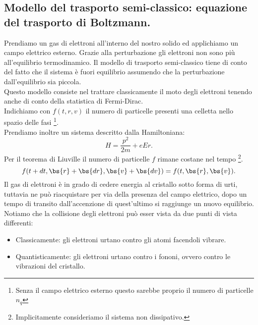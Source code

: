 \subsection{Modello del trasporto semi-classico: equazione del trasporto di Boltzmann.}
\label{subsubsec:Modello del trasporto semi-classico.}
Prendiamo un gas di elettroni all'interno del nostro solido ed applichiamo un campo elettrico esterno. Grazie alla perturbazione gli elettroni non sono più all'equilibrio termodinamico.
Il modello di trasporto semi-classico tiene di conto del fatto che il sistema è fuori equilibrio assumendo che la perturbazione dall'equilibrio sia piccola.\\
Questo modello consiste nel trattare classicamente il moto degli elettroni tenendo anche di conto della statistica di Fermi-Dirac.\\
Indichiamo con $f( t, r, v) $ il numero di particelle presenti una celletta nello spazio delle fasi \footnote{Senza il campo elettrico esterno questo sarebbe proprio il numero di particelle $n_q$}.\\
Prendiamo inoltre un sistema descritto dalla Hamiltoniana:
\[
	H = \frac{p^2}{2m} + eEr
.\] 
Per il teorema di Liuville il numero di particelle $f$ rimane costane nel tempo \footnote{Implicitamente consideriamo il sistema non dissipativo.}.
\[
	f( t+dt,\bs{r}+\bs{dr}, \bs{v}+\bs{dv})
	= 
	f( t, \bs{r}, \bs{v}) 
.\] 
Il gas di elettroni è in grado di cedere energia al cristallo sotto forma di urti, tuttavia ne può riacquistare per via della presenza del campo elettrico, dopo un tempo di transito dall'accenzione di quest'ultimo si raggiunge un nuovo equilibrio.\\
Notiamo che la collisione degli elettroni può esser vista da due punti di vista differenti:
\begin{itemize}
	\item Classicamente: gli elettroni urtano contro gli atomi facendoli vibrare.
	\item Quantisticamente: gli elettroni urtano contro i fononi, ovvero contro le
		vibrazioni del cristallo.
\end{itemize}
